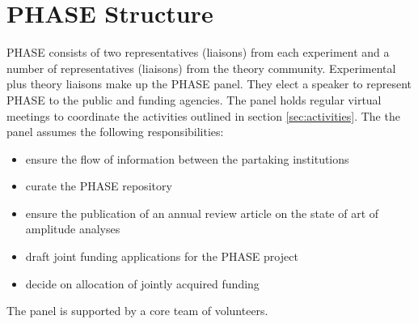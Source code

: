 \section{PHASE Structure}
\label{sec:structure}
PHASE consists of two representatives (liaisons) from each experiment and a number of representatives (liaisons) from the theory community. Experimental plus theory liaisons make up the PHASE panel. They elect a speaker to represent PHASE to the public and funding agencies. The panel holds regular virtual meetings to coordinate the activities outlined in section \ref{sec:activities}. The the panel assumes the following responsibilities:
\begin{itemize}
\item ensure the flow of information between the partaking institutions
\item curate the PHASE repository
\item ensure the publication of an annual review article on the state of art of amplitude analyses
\item draft joint funding applications for the PHASE project
\item decide on allocation of jointly acquired funding
\end{itemize}

The panel is supported by a core team of volunteers.

